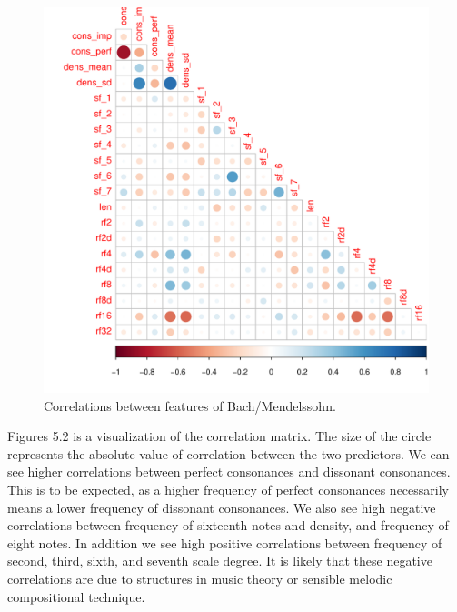 \documentclass[12pt,twoside]{reedthesis}
\theoremstyle{definition}
\theoremstyle{definition}
\theoremstyle{definition}
\theoremstyle{remark}
\begin{document}
\begin{figure}[H]
\centering
\includegraphics[scale = .7]{images/cor_circles_b.pdf}
\caption{Correlations between features of Bach/Mendelssohn.}
\label{subd}
\end{figure}
Figures 5.2 is a visualization of the correlation matrix. The size of
the circle represents the absolute value of correlation between the two
predictors. We can see higher correlations between perfect consonances
and dissonant consonances. This is to be expected, as a higher frequency
of perfect consonances necessarily means a lower frequency of dissonant
consonances. We also see high negative correlations between frequency of
sixteenth notes and density, and frequency of eight notes. In addition
we see high positive correlations between frequency of second, third,
sixth, and seventh scale degree. It is likely that these negative
correlations are due to structures in music theory or sensible melodic
compositional technique.
\end{document}
